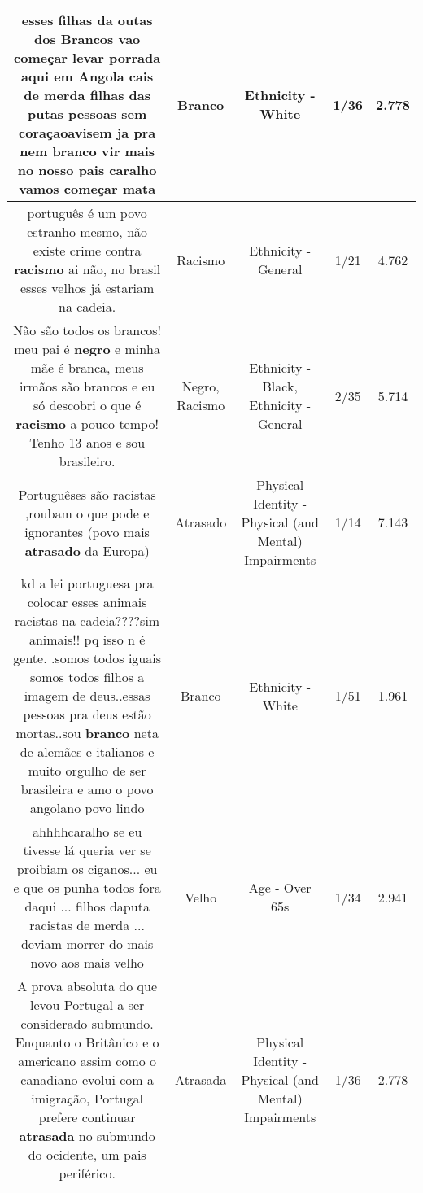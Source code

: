 \documentclass[11pt]{article}
\newlength\mylength
\begin{document}
\begin{center}
\begin{longtable}{|C{.65\mylength}|C{.30\mylength}|C{.12\mylength}|C{.12\mylength}|C{.12\mylength}|}
  \small esses filhas da outas dos Brancos vao começar levar porrada aqui em Angola cais de merda filhas das putas pessoas sem coraçaoavisem ja  pra nem \textbf{branco} vir mais no nosso pais caralho vamos começar mata\normalsize   & Branco & Ethnicity - White & 1/36 & 2.778 \\  \hline
  \small português é um povo estranho mesmo, não existe crime contra \textbf{racismo} ai não, no brasil esses velhos já estariam na cadeia.\normalsize   & Racismo & Ethnicity - General & 1/21 & 4.762 \\  \hline
  \small Não são todos os brancos! meu pai é \textbf{negro} e minha mãe é branca, meus irmãos são brancos e eu só descobri o que é \textbf{racismo} a pouco tempo! Tenho 13 anos e sou brasileiro.\normalsize   & Negro, Racismo & Ethnicity - Black, Ethnicity - General & 2/35 & 5.714 \\  \hline
  \small Portuguêses são racistas ,roubam o que pode e  ignorantes (povo mais \textbf{atrasado} da Europa)\normalsize   & Atrasado & Physical Identity - Physical (and Mental) Impairments & 1/14 & 7.143 \\  \hline
  \small kd a lei portuguesa pra colocar esses animais racistas na cadeia????sim animais!! pq isso n é gente. .somos todos iguais somos todos filhos a imagem de deus..essas pessoas pra deus estão mortas..sou \textbf{branco} neta de alemães e italianos e muito orgulho de ser brasileira e amo o povo angolano povo lindo\normalsize   & Branco & Ethnicity - White & 1/51 & 1.961 \\  \hline
  \small ahhhhcaralho se eu tivesse lá queria ver se proibiam os ciganos... eu e que os punha todos fora daqui ... filhos daputa racistas de merda ... deviam morrer do mais novo aos mais velho\normalsize   & Velho & Age - Over 65s & 1/34 & 2.941 \\  \hline
  \small A prova absoluta do que levou Portugal a ser considerado submundo. Enquanto o Britânico e o americano assim como o canadiano evolui com a imigração, Portugal prefere continuar \textbf{atrasada} no submundo do ocidente, um pais periférico.\normalsize   & Atrasada & Physical Identity - Physical (and Mental) Impairments & 1/36 & 2.778 \\  \hline

\end{longtable}
\end{center}
\end{document}
